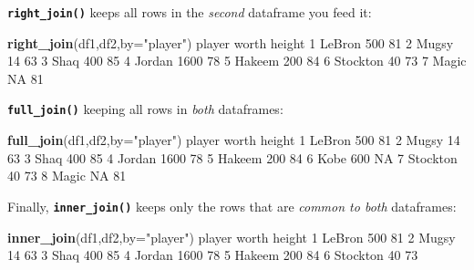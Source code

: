 \documentclass[
]{book}
\newenvironment{Shaded}{\begin{snugshade}}{\end{snugshade}}
\newcommand{\DataTypeTok}[1]{\textcolor[rgb]{0.13,0.29,0.53}{#1}}
\newcommand{\DecValTok}[1]{\textcolor[rgb]{0.00,0.00,0.81}{#1}}
\newcommand{\KeywordTok}[1]{\textcolor[rgb]{0.13,0.29,0.53}{\textbf{#1}}}
\newcommand{\NormalTok}[1]{#1}
\newcommand{\OtherTok}[1]{\textcolor[rgb]{0.56,0.35,0.01}{#1}}
\newcommand{\StringTok}[1]{\textcolor[rgb]{0.31,0.60,0.02}{#1}}
\begin{document}
\textbf{\texttt{right\_join()}} keeps all rows in the \emph{second} dataframe you feed it:

\begin{Shaded}
\begin{Highlighting}[]
\KeywordTok{right_join}\NormalTok{(df1,df2,}\DataTypeTok{by=}\StringTok{"player"}\NormalTok{)}
\NormalTok{    player worth height}
\DecValTok{1}\NormalTok{   LeBron   }\DecValTok{500}     \DecValTok{81}
\DecValTok{2}\NormalTok{    Mugsy    }\DecValTok{14}     \DecValTok{63}
\DecValTok{3}\NormalTok{     Shaq   }\DecValTok{400}     \DecValTok{85}
\DecValTok{4}\NormalTok{   Jordan  }\DecValTok{1600}     \DecValTok{78}
\DecValTok{5}\NormalTok{   Hakeem   }\DecValTok{200}     \DecValTok{84}
\DecValTok{6}\NormalTok{ Stockton    }\DecValTok{40}     \DecValTok{73}
\DecValTok{7}\NormalTok{    Magic    }\OtherTok{NA}     \DecValTok{81}
\end{Highlighting}
\end{Shaded}

\textbf{\texttt{full\_join()}} keeping all rows in \emph{both} dataframes:

\begin{Shaded}
\begin{Highlighting}[]
\KeywordTok{full_join}\NormalTok{(df1,df2,}\DataTypeTok{by=}\StringTok{"player"}\NormalTok{)}
\NormalTok{    player worth height}
\DecValTok{1}\NormalTok{   LeBron   }\DecValTok{500}     \DecValTok{81}
\DecValTok{2}\NormalTok{    Mugsy    }\DecValTok{14}     \DecValTok{63}
\DecValTok{3}\NormalTok{     Shaq   }\DecValTok{400}     \DecValTok{85}
\DecValTok{4}\NormalTok{   Jordan  }\DecValTok{1600}     \DecValTok{78}
\DecValTok{5}\NormalTok{   Hakeem   }\DecValTok{200}     \DecValTok{84}
\DecValTok{6}\NormalTok{     Kobe   }\DecValTok{600}     \OtherTok{NA}
\DecValTok{7}\NormalTok{ Stockton    }\DecValTok{40}     \DecValTok{73}
\DecValTok{8}\NormalTok{    Magic    }\OtherTok{NA}     \DecValTok{81}
\end{Highlighting}
\end{Shaded}

Finally, \textbf{\texttt{inner\_join()}} keeps only the rows that are \emph{common to both} dataframes:

\begin{Shaded}
\begin{Highlighting}[]
\KeywordTok{inner_join}\NormalTok{(df1,df2,}\DataTypeTok{by=}\StringTok{"player"}\NormalTok{)}
\NormalTok{    player worth height}
\DecValTok{1}\NormalTok{   LeBron   }\DecValTok{500}     \DecValTok{81}
\DecValTok{2}\NormalTok{    Mugsy    }\DecValTok{14}     \DecValTok{63}
\DecValTok{3}\NormalTok{     Shaq   }\DecValTok{400}     \DecValTok{85}
\DecValTok{4}\NormalTok{   Jordan  }\DecValTok{1600}     \DecValTok{78}
\DecValTok{5}\NormalTok{   Hakeem   }\DecValTok{200}     \DecValTok{84}
\DecValTok{6}\NormalTok{ Stockton    }\DecValTok{40}     \DecValTok{73}
\end{Highlighting}
\end{Shaded}
\end{document}
